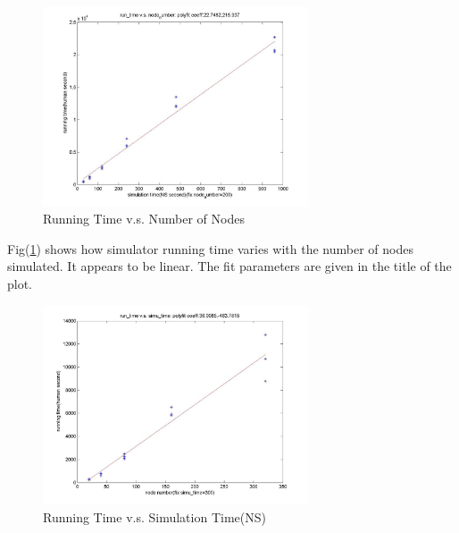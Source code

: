 \documentclass[11pt,a4paper]{article}
\begin{document}

\begin{figure}[htb]
\centering
	\includegraphics[width=0.7\textwidth]{../fig/runtime_vs_nodenum.jpg}
	\caption{Running Time v.s. Number of Nodes}
	\label{fig:simu_bm_rt_node}
\end{figure}

Fig(\ref{fig:simu_bm_rt_node}) shows how simulator running time 
varies with the number of nodes simulated. 
It appears to be linear. The fit parameters are given in 
the title of the plot. 


\begin{figure}[htb]
\centering
	\includegraphics[width=0.7\textwidth]{../fig/runtime_vs_simutime.jpg}
	\caption{Running Time v.s. Simulation Time(NS)}
	\label{fig:simu_bm_rt_st}
\end{figure}
\end{document}
